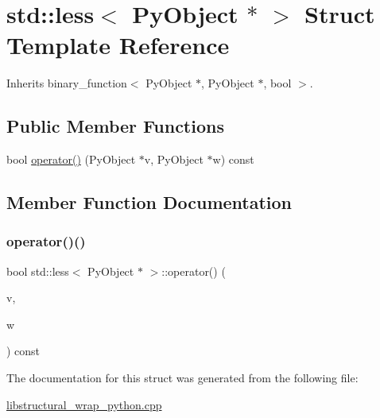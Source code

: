 \hypertarget{structstd_1_1less_3_01_py_object_01_5_01_4}{}\section{std\+:\+:less$<$ Py\+Object $\ast$ $>$ Struct Template Reference}
\label{structstd_1_1less_3_01_py_object_01_5_01_4}


Inherits binary\+\_\+function$<$ Py\+Object $\ast$, Py\+Object $\ast$, bool $>$.

\subsection*{Public Member Functions}
\begin{DoxyCompactItemize}
\item 
bool \hyperlink{structstd_1_1less_3_01_py_object_01_5_01_4_ae89d137f05b6d1c8c632ec1c5bf4562d}{operator()} (Py\+Object $\ast$v, Py\+Object $\ast$w) const
\end{DoxyCompactItemize}


\subsection{Member Function Documentation}
\mbox{\label{structstd_1_1less_3_01_py_object_01_5_01_4_ae89d137f05b6d1c8c632ec1c5bf4562d}} 
\subsubsection{\texorpdfstring{operator()()}{operator()()}}
{\footnotesize\ttfamily bool std\+::less$<$ Py\+Object $\ast$ $>$\+::operator() (\begin{DoxyParamCaption}\item[{Py\+Object $\ast$}]{v,  }\item[{Py\+Object $\ast$}]{w }\end{DoxyParamCaption}) const\hspace{0.3cm}{\ttfamily [inline]}}



The documentation for this struct was generated from the following file\+:\begin{DoxyCompactItemize}
\item 
\hyperlink{libstructural__wrap__python_8cpp}{libstructural\+\_\+wrap\+\_\+python.\+cpp}\end{DoxyCompactItemize}
